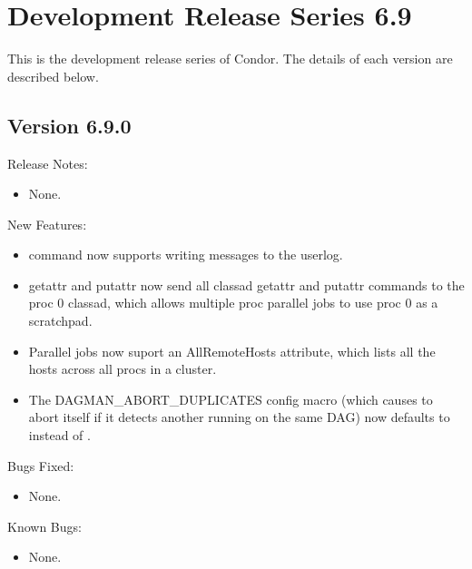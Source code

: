 \section{\label{sec:History-6-9}Development Release Series 6.9}

This is the development release series of Condor.
The details of each version are described below.


\subsection*{\label{sec:New-6-9-0}Version 6.9.0}

\noindent Release Notes:

\begin{itemize}

\item None.

\end{itemize}


\noindent New Features:

\begin{itemize}

\item {} command now supports writing messages to the userlog.

\item {} getattr and putattr now send all classad getattr and putattr
commands to the proc 0 classad, which allows multiple proc parallel jobs to
use proc 0 as a scratchpad.

\item Parallel jobs now suport an AllRemoteHosts attribute, which lists all the
hosts across all procs in a cluster.

\item The DAGMAN\_ABORT\_DUPLICATES config macro (which causes
 to abort itself if it detects another 
running on the same DAG) now defaults to  instead of
.

\end{itemize}

\noindent Bugs Fixed:

\begin{itemize}

\item None.

\end{itemize}

\noindent Known Bugs:

\begin{itemize}

\item None.

\end{itemize}

